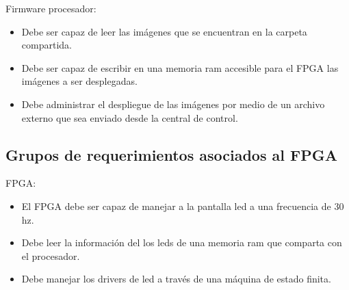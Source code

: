 Firmware procesador:
\begin{itemize}
\item Debe ser capaz de leer las imágenes que se encuentran en la carpeta compartida.
\item Debe ser capaz de escribir en una  memoria ram accesible para el FPGA  las imágenes a ser desplegadas.
\item Debe administrar el despliegue de las imágenes por medio de un archivo externo que sea enviado desde la central de control.
\end{itemize}
\subsection{Grupos de requerimientos asociados al FPGA}
FPGA:
\begin{itemize}
\item El FPGA debe ser capaz de manejar a la pantalla led a una frecuencia de  30 hz.
\item Debe leer la información del los leds de una memoria ram que comparta con el procesador.
\item Debe manejar los drivers de led a través de una máquina de estado finita.   
\end{itemize}